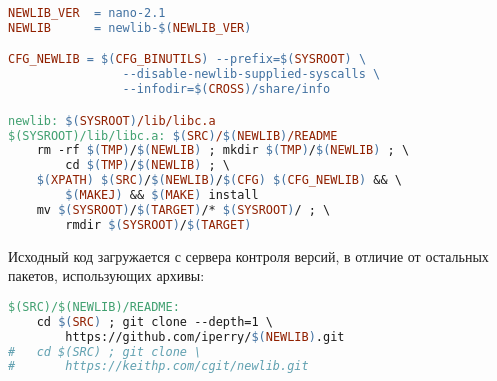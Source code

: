 \clearpage
\begin{lstlisting}[language=make]
NEWLIB_VER	= nano-2.1
NEWLIB		= newlib-$(NEWLIB_VER)

CFG_NEWLIB = $(CFG_BINUTILS) --prefix=$(SYSROOT) \
				--disable-newlib-supplied-syscalls \
				--infodir=$(CROSS)/share/info

newlib: $(SYSROOT)/lib/libc.a
$(SYSROOT)/lib/libc.a: $(SRC)/$(NEWLIB)/README
	rm -rf $(TMP)/$(NEWLIB) ; mkdir $(TMP)/$(NEWLIB) ; \
		cd $(TMP)/$(NEWLIB) ; \
	$(XPATH) $(SRC)/$(NEWLIB)/$(CFG) $(CFG_NEWLIB) && \
		$(MAKEJ) && $(MAKE) install
	mv $(SYSROOT)/$(TARGET)/* $(SYSROOT)/ ; \
		rmdir $(SYSROOT)/$(TARGET)
\end{lstlisting}
\clearpage
Исходный код \file{newlib} загружается с сервера контроля версий, в отличие от
остальных пакетов, использующих архивы:
\begin{lstlisting}[language=make]
$(SRC)/$(NEWLIB)/README:
	cd $(SRC) ; git clone --depth=1 \
		https://github.com/iperry/$(NEWLIB).git
#	cd $(SRC) ; git clone \
#		https://keithp.com/cgit/newlib.git
\end{lstlisting}
